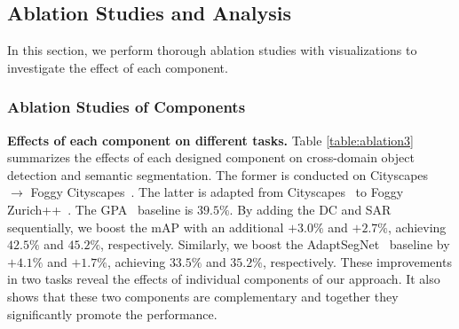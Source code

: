 \documentclass[10pt,journal,compsoc]{IEEEtran}
\begin{document}
\subsection{Ablation Studies and Analysis}
\label{sec:ablation}
In this section, we perform thorough ablation studies with visualizations to investigate the effect of each component. 
\subsubsection{Ablation Studies of Components}

\noindent \textbf{Effects of each component on different tasks.} 
Table \ref{table:ablation3} summarizes the effects of each designed component on cross-domain object detection and semantic segmentation. The former is conducted on  Cityscapes~\cite{cordts2016cityscapes} $\rightarrow$  Foggy Cityscapes~\cite{FoggyCity}. The latter is adapted from Cityscapes~\cite{cordts2016cityscapes} to Foggy Zurich++~\cite{FoggyCity,FoggyDriving}. 
The GPA~\cite{GPA} baseline is $39.5\%$.  By adding the DC and SAR sequentially, we boost the mAP with an additional $+3.0\%$ and $+2.7\%$, achieving $42.5\%$ and $45.2\%$, respectively. Similarly, we boost the AdaptSegNet~\cite{AdaptSegNet} baseline by $+4.1\%$ and $+1.7\%$, achieving $33.5\%$ and $35.2\%$, respectively.
These improvements in two tasks reveal the effects of individual components of our approach. It also shows that these two components are complementary and together they significantly promote the performance.

\begin{table}[t]
\caption{
Ablation study of each component on two tasks.
}
\label{table:ablation3}
\centering
{}
\end{table}
\end{document}
